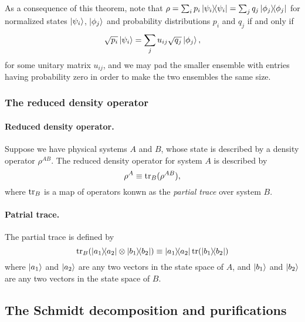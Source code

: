 \documentclass{article}
\numberwithin{theorem}{section}
\numberwithin{corollary}{section}
\numberwithin{postulate}{section}
\begin{document}
As a consequence of this theorem, note that $\rho = \sum_i p_i\op{\psi_i} =
\sum_j q_j\op{\phi_j}$ for normalized states $\ket{\psi_i}$, $\ket{\phi_j}$ and
probability distributions $p_i$ and $q_j$ if and only if \[
  \sqrt{p_i}\ket{\psi_i} = \sum_j u_{ij}\sqrt{q_j}\ket{\phi_j},
\] for some unitary matrix $u_{ij}$, and we may pad the smaller ensemble with
entries having probability zero in order to make the two ensembles the same
size.

\subsubsection{The reduced density operator}

\paragraph{Reduced density operator.} Suppose we have physical systems $A$ and
$B$, whose state is described by a density operator $\rho^{AB}$. The reduced
density operator for system $A$ is described by \[
  \rho^A \equiv \tr_B(\rho^{AB}),
\] where $\tr_B$ is a map of operators konwn as the \emph{partial trace} over
system $B$.

\paragraph{Patrial trace.} The partial trace is defined by \[
  \tr_B(\op{a_1}{a_2} \otimes \op{b_1}{b_2}) \equiv
  \op{a_1}{a_2}\tr(\op{b_1}{b_2})
\] where $\ket{a_1}$ and $\ket{a_2}$ are any two vectors in the state space of
$A$, and $\ket{b_1}$ and $\ket{b_2}$ are any two vectors in the state space of
$B$.

\subsection{The Schmidt decomposition and purifications}
\end{document}
